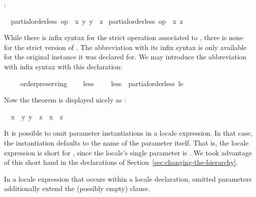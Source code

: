 \begin{isabellebody}
\begin{isamarkuptext}
  :
  \begin{isabelle}%
\ \ {\isasymlbrakk}partial{\isacharunderscore}order{\isachardot}less\ op\ {\isasympreceq}\ {\isacharquery}x\ {\isacharquery}y{\isacharsemicolon}\ {\isacharquery}y\ {\isasympreceq}\ {\isacharquery}z{\isasymrbrakk}\isanewline
\isaindent{\ \ }{\isasymLongrightarrow}\ partial{\isacharunderscore}order{\isachardot}less\ op\ {\isasympreceq}\ {\isacharquery}x\ {\isacharquery}z%
\end{isabelle}

  While there is infix syntax for the strict operation associated to
  , there is none for the strict version of .  The abbreviation  with its infix syntax is only
  available for the original instance it was declared for.  We may
  introduce the abbreviation  with infix syntax \isa{{\isasymprec}}
  with this declaration:%
\end{isamarkuptext}%
\isamarkuptrue%
\ \ \isamarkupfalse%
\ {\isacharparenleft}\ order{\isacharunderscore}preserving{\isacharparenright}\isanewline
\ \ \ \ less{\isacharprime}\ {\isacharparenleft}\ {\isachardoublequoteopen}{\isasymprec}{\isachardoublequoteclose}\ {}{}{\isacharparenright}\ \ {\isachardoublequoteopen}less{\isacharprime}\ {\isasymequiv}\ partial{\isacharunderscore}order{\isachardot}less\ le{\isacharprime}{\isachardoublequoteclose}%
\begin{isamarkuptext}%
Now the theorem is displayed nicely as
  :
  \begin{isabelle}%
\ \ {\isasymlbrakk}{\isacharquery}x\ {\isasymprec}\ {\isacharquery}y{\isacharsemicolon}\ {\isacharquery}y\ {\isasympreceq}\ {\isacharquery}z{\isasymrbrakk}\ {\isasymLongrightarrow}\ {\isacharquery}x\ {\isasymprec}\ {\isacharquery}z%
\end{isabelle}%
\end{isamarkuptext}%
\isamarkuptrue%
%
\isamarkuptrue%
%
\begin{isamarkuptext}%
It is possible to omit parameter instantiations in a locale
  expression.  In that case, the instantiation defaults to the name of
  the parameter itself.  That is, the locale expression  is short for , since the
  locale's single parameter is .  We took advantage of this
  short hand in the  declarations of
  Section~\ref{sec:changing-the-hierarchy}.%
\end{isamarkuptext}%
\isamarkuptrue%
%
\begin{isamarkuptext}%
In a locale expression that occurs within a locale
  declaration, omitted parameters additionally extend the (possibly
  empty)  clause.


\end{isamarkuptext}
\end{isabellebody}
